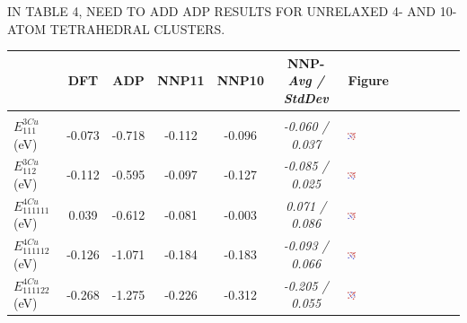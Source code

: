 \documentclass{article}
\begin{document}
IN TABLE 4, NEED TO ADD ADP RESULTS FOR UNRELAXED 4- AND 10- ATOM TETRAHEDRAL CLUSTERS.
%

\begin{table}[H]
\begin{tabular}{l|cccccV}%
\hline%
&DFT&ADP&NNP11& NNP10& NNP-\emph{Avg / StdDev} & Figure \\%
\hline%
\hline%
&&&&&& \\
$E^{3Cu}_{111}$ (eV)&-0.073&{-}0.718&{-}0.112& -0.096 &\emph{-0.060 / 0.037}  & \includegraphics[width=0.07\textwidth]{figures/SoluteCluster_111.png}  \\%
$E^{3Cu}_{112}$ (eV)&-0.112&{-}0.595&{-}0.097& -0.127 &\emph{-0.085 / 0.025}  &  \includegraphics[width=0.07\textwidth]{figures/SoluteCluster_112.png}\\%
$E^{4Cu}_{111111}$(eV)&0.039&{-}0.612&{-}0.081& -0.003 &\emph{0.071 / 0.086}  &  \includegraphics[width=0.07\textwidth]{figures/SoluteCluster_111111.png}\\%
$E^{4Cu}_{111112}$(eV)&-0.126&{-}1.071&{-}0.184& -0.183 &\emph{-0.093 / 0.066}& \includegraphics[width=0.07\textwidth]{figures/SoluteCluster_111112.png} \\%
$E^{4Cu}_{111122}$(eV)&-0.268&{-}1.275&{-}0.226& -0.312 &\emph{-0.205 / 0.055}&  \includegraphics[width=0.07\textwidth]{figures/SoluteCluster_111122.png}\\%

\end{tabular}
\end{table}
\end{document}
